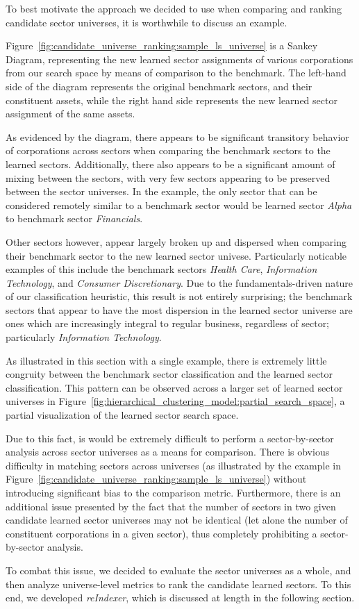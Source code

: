 \documentclass[../main.tex]{subfiles}
\begin{document}
To best motivate the approach we decided to use when comparing and ranking candidate sector universes, it is worthwhile to discuss an example.

Figure~\ref{fig:candidate_universe_ranking:sample_ls_universe} is a Sankey Diagram, representing the new learned sector assignments of various corporations from our search space by means of comparison to the benchmark. The left-hand side of the diagram represents the original benchmark sectors, and their constituent assets, while the right hand side represents the new learned sector assignment of the same assets.

As evidenced by the diagram, there appears to be significant transitory behavior of corporations across sectors when comparing the benchmark sectors to the learned sectors. Additionally, there also appears to be a significant amount of mixing between the sectors, with very few sectors appearing to be preserved between the sector universes. In the example, the only sector that can be considered remotely similar to a benchmark sector would be learned sector \textit{Alpha} to benchmark sector \textit{Financials}.

Other sectors however, appear largely broken up and dispersed when comparing their benchmark sector to the new learned sector univese. Particularly noticable examples of this include the benchmark sectors \textit{Health Care}, \textit{Information Technology}, and \textit{Consumer Discretionary}. Due to the fundamentals-driven nature of our classification heuristic, this result is not entirely surprising; the benchmark sectors that appear to have the most dispersion in the learned sector universe are ones which are increasingly integral to regular business, regardless of sector; particularly \textit{Information Technology}.

As illustrated in this section with a single example, there is extremely little congruity between the benchmark sector classification and the learned sector classification. This pattern can be observed across a larger set of learned sector universes in Figure~\ref{fig:hierarchical_clustering_model:partial_search_space}, a partial visualization of the learned sector search space.

Due to this fact, is would be extremely difficult to perform a sector-by-sector analysis across sector universes as a means for comparison. There is obvious difficulty in matching sectors across universes (as illustrated by the example in Figure~\ref{fig:candidate_universe_ranking:sample_ls_universe}) without introducing significant bias to the comparison metric. Furthermore, there is an additional issue presented by the fact that the number of sectors in two given candidate learned sector universes may not be identical (let alone the number of constituent corporations in a given sector), thus completely prohibiting a sector-by-sector analysis.

To combat this issue, we decided to evaluate the sector universes as a whole, and then analyze universe-level metrics to rank the candidate learned sectors. To this end, we developed \textit{reIndexer}, which is discussed at length in the following section.
\end{document}
